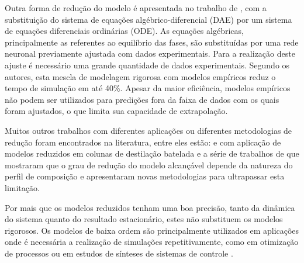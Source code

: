 \begin{enumerate}
Outra forma de redução do modelo é apresentada no trabalho de , com 
a substituição do sistema de equações algébrico-diferencial (DAE) por um sistema de
equações diferenciais ordinárias (ODE). As equações algébricas, principalmente as referentes ao equilíbrio das fases, são
substituídas por uma rede neuronal previamente ajustada com dados experimentais. Para a realização deste ajuste
é necessário uma grande quantidade de dados experimentais. Segundo os autores, esta mescla de modelagem rigorosa com modelos
empíricos reduz o tempo de simulação em até 40\%. Apesar da maior eficiência, modelos empíricos
não podem ser utilizados para predições fora da faixa de dados com os quais foram ajustados, o que limita sua
capacidade de extrapolação.

Muitos outros trabalhos com diferentes aplicações ou diferentes metodologias de redução foram encontrados
na literatura, entre eles estão:  e  com aplicação de modelos
reduzidos em colunas de destilação batelada e a série de trabalhos de \citeauthor{Srivastava:1985} que
mostraram que o grau de redução do
modelo alcançável depende da natureza do perfil de composição e apresentaram novas
metodologias para ultrapassar esta limitação.

Por mais que os modelos reduzidos tenham uma boa precisão, tanto da dinâmica do sistema quanto do resultado estacionário,
estes não substituem os modelos rigorosos. Os modelos de baixa ordem são principalmente utilizados em aplicações onde é
necessária a realização de simulações repetitivamente, como em otimização de processos ou em estudos de sínteses de
sistemas de controle \cite{Cho:1984}.



\end{enumerate}
